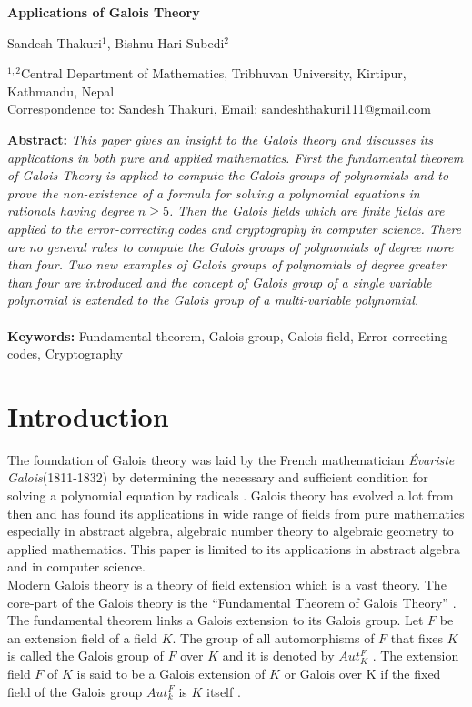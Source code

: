 \documentclass[a4paper,twoside,10pt]{article}
\theoremstyle{plain}
\theoremstyle{definition}
\begin{document}
\linenumbers
{\Large
\begin{center}
\bf{\LARGE Applications of Galois Theory}
\end{center}}
\begin{center}
Sandesh Thakuri$^{1}$, Bishnu Hari Subedi$^{2}$
\end{center}

\begin{center}
{\footnotesize
$^{1,2}$Central Department of Mathematics, Tribhuvan University, Kirtipur, Kathmandu, Nepal \\[1mm]
Correspondence to: Sandesh Thakuri, Email: sandeshthakuri111@gmail.com
}
\end{center}

\noindent
\textbf{Abstract:} {\it This paper gives an insight to the Galois theory and discusses its applications in both pure and applied mathematics. First the fundamental theorem of Galois Theory is applied to compute the Galois groups of polynomials and to prove the non-existence of a formula for solving a polynomial equations in rationals having degree \(n \geq 5\). Then the Galois fields which are finite fields are applied to the error-correcting codes and cryptography in computer science. There are no general rules to compute the Galois groups of polynomials of degree more than four. Two new examples of Galois groups of polynomials of degree greater than four are introduced and the concept of Galois group of a single variable polynomial is extended to the Galois group of a multi-variable polynomial.}\\\\
\textbf{Keywords:} Fundamental theorem, Galois group, Galois field, Error-correcting codes, Cryptography

\section{Introduction}
The foundation of Galois theory was laid by the French mathematician \textit{Évariste Galois}(1811-1832) by determining the necessary and sufficient condition for solving a polynomial equation by radicals \cite{galois}. Galois theory has evolved a lot from then and has found its applications in wide range of fields from pure mathematics especially in abstract algebra, algebraic number theory to algebraic geometry to applied mathematics. This paper is limited to its applications in abstract algebra and in computer science. \\[2mm]
Modern Galois theory is a theory of field extension which is a vast theory. The core-part of the Galois theory is the ``Fundamental Theorem of Galois Theory'' \cite {hunger}. The fundamental theorem links a Galois extension to its Galois group. Let \(F\) be an extension field of a field \(K\). The group of all automorphisms of \(F\) that fixes \(K\) is called the Galois group of \(F\) over \(K\) and it is denoted by \(Aut_K^F\) \cite{hunger}. The extension field \(F\) of \(K\) is said to be a Galois extension of \(K\) or Galois over K if the fixed field of the Galois group \(Aut_k^F\) is \(K\) itself \cite{hunger}.
\end{document}
